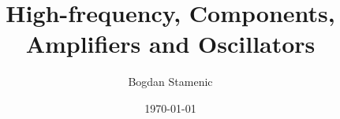 

\newcommand{\FormelsammlungTitel}{High-frequency, Components, Amplifiers and Oscillators}
\newcommand{\FormelsammlungAutor}{Bogdan Stamenic}
\setcounter{tocdepth}{2} %


	\title{\FormelsammlungTitel}
	\author{\FormelsammlungAutor}
	\date{\today}
	\begin{multicols}{3}
        \maketitle
        \tableofcontents
        
        
        
        
        
        
        
        
	\end{multicols}

